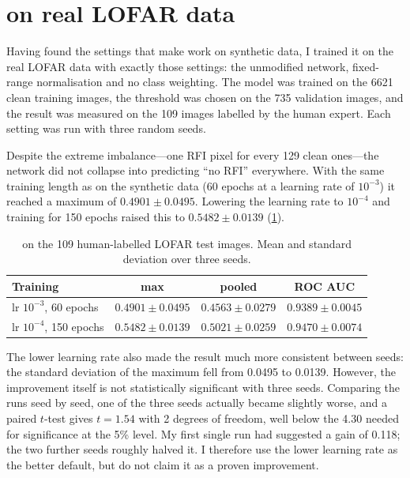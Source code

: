 \section{\tfunet{} on real LOFAR data}
\label{sec:tfunet_lofar}
Having found the settings that make \tfunet{} work on synthetic data, I trained
it on the real LOFAR data with exactly those settings: the unmodified network,
fixed-range normalisation and no class weighting. The model was trained on the
6621 clean training images, the threshold was chosen on the 735 validation
images, and the result was measured on the 109 images labelled by the human
expert. Each setting was run with three random seeds.

Despite the extreme imbalance---one RFI pixel for every 129 clean ones---the
network did not collapse into predicting ``no RFI'' everywhere. With the same
training length as on the synthetic data (60 epochs at a learning rate of
$10^{-3}$) it reached a maximum \Fone{} of $0.4901 \pm 0.0495$. Lowering the
learning rate to $10^{-4}$ and training for 150 epochs raised this to
$0.5482 \pm 0.0139$ (\cref{tab:tfunet_lofar}).

\begin{table}[H]
  \centering
  \caption{\tfunet{} on the 109 human-labelled LOFAR test images. Mean and
    standard deviation over three seeds.}
  \label{tab:tfunet_lofar}
  \begin{tabular}{lccc}
    \toprule
    Training & max \Fone{} & pooled \Fone{} & ROC AUC \\
    \midrule
    lr $10^{-3}$, 60 epochs  & $0.4901 \pm 0.0495$ & $0.4563 \pm 0.0279$ & $0.9389 \pm 0.0045$ \\
    lr $10^{-4}$, 150 epochs & $0.5482 \pm 0.0139$ & $0.5021 \pm 0.0259$ & $0.9470 \pm 0.0074$ \\
    \bottomrule
  \end{tabular}
\end{table}

The lower learning rate also made the result much more consistent between
seeds: the standard deviation of the maximum \Fone{} fell from 0.0495 to
0.0139. However, the improvement itself is not statistically significant with
three seeds. Comparing the runs seed by seed, one of the three seeds actually
became slightly worse, and a paired $t$-test gives $t = 1.54$ with 2 degrees of
freedom, well below the 4.30 needed for significance at the 5\% level. My
first single run had suggested a gain of 0.118; the two further seeds roughly
halved it. I therefore use the lower learning rate as the better default, but
do not claim it as a proven improvement.

